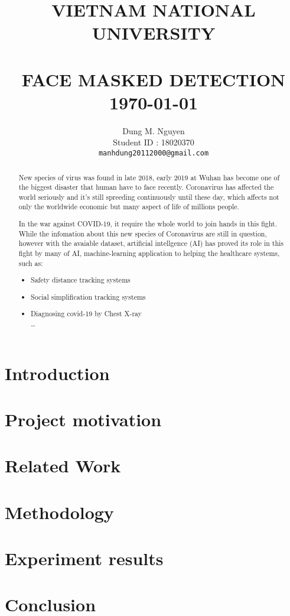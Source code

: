 \documentclass[paper=a4, fontsize=11pt,twoside]{scrartcl}
\title{	\normalsize \textsc{VIETNAM NATIONAL UNIVERSITY} 	%
		 	\\[2.0cm]								%
			\HRule{0.5pt} \\						%
			\LARGE \textbf{\uppercase{Face Masked Detection}}	%
			\HRule{2pt} \\ [0.5cm]		%
			\normalsize \today			%
		}
\author{
		Dung M. Nguyen\\	
		Student ID : 18020370\\	
        \texttt{manhdung20112000@gmail.com} \\
}
\makeatletter
\def\printtitle{%
    {\centering \@title\par}}
\def\printauthor{%
    {\centering \large \@author}}
\makeatother
\begin{document}
\thispagestyle{empty}		%

\printtitle					%
  	\vfill
\printauthor				%
\newpage

\tableofcontents
\newpage

    \begin{abstract}
        New species of virus was found in late 2018, early 2019 at Wuhan 
        has become one of the biggest disaster that human have to face 
        recently. Coronavirus has affected the world seriously and
        it's still spreeding continuously until these day, which affects not only
        the worldwide economic but many aspect of life of millions people. 

        In the war against COVID-19, it require the whole world to join hands 
        in this fight. While the infomation about this new species of Coronavirus
        are still in question, however with the avaiable dataset, artificial intellgence (AI) 
        has proved its role in this fight by many of AI, machine-learning application to
        helping the healthcare systems, such as: 
        \begin{itemize}
            \item Safety distance tracking systems
            \item Social simplification tracking systems
            \item Diagnosing covid-19 by Chest X-ray \\
            \ldots
        \end{itemize} 
    \end{abstract}

    \section{Introduction}
    \label{sec:intro}

    \section{Project motivation}
    \label{sec:motivate}

    \section{Related Work}
    \label{sec:relate}

    \section{Methodology}
    \label{sec:method}

    \section{Experiment results}
    \label{sec:res}

    \section{Conclusion}
    \label{sec:conclusion}

    
     
\end{document}
